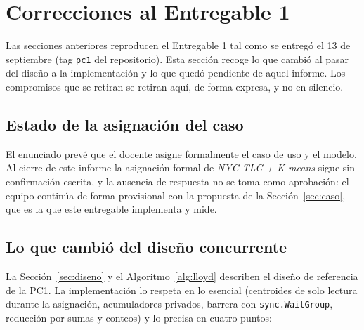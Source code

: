 \section{Correcciones al Entregable 1}\label{sec:correcciones}

Las secciones anteriores reproducen el Entregable 1 tal como se entregó el 13 de septiembre
(tag \texttt{pc1} del repositorio). Esta sección recoge lo que cambió al pasar del diseño a la
implementación y lo que quedó pendiente de aquel informe. Los compromisos que se retiran se retiran
aquí, de forma expresa, y no en silencio.

\subsection{Estado de la asignación del caso}

El enunciado prevé que el docente asigne formalmente el caso de uso y el modelo. Al cierre de este
informe la asignación formal de \emph{NYC TLC + K-means} sigue sin confirmación escrita, y la
ausencia de respuesta no se toma como aprobación: el equipo continúa de forma provisional con la
propuesta de la Sección~\ref{sec:caso}, que es la que este entregable implementa y mide.

\subsection{Lo que cambió del diseño concurrente}

La Sección~\ref{sec:diseno} y el Algoritmo~\ref{alg:lloyd} describen el diseño de referencia de la
PC1. La implementación lo respeta en lo esencial (centroides de solo lectura durante la asignación,
acumuladores privados, barrera con \texttt{sync.WaitGroup}, reducción por sumas y conteos) y lo
precisa en cuatro puntos:

